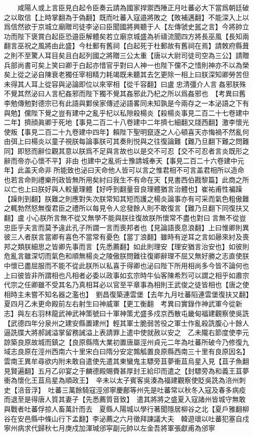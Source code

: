 　　咸陽人或上言臣見白起令臣奏云請為國家捍禦西陲正月吐蕃必大下當爲朝廷破之以取信【上時掌翻為于偽翻】既而吐蕃入寇邉將敗之【敗補邁翻】不能深入上以爲信然欲于京城立廟贈司徒李泌曰臣聞國將興聽于人【左傳虢史嚚之言】今將帥立功而陛下褒賞白起臣恐邉臣解體矣若立廟京城盛為祈禱流聞四方將長巫風【長知兩翻言巫祝之風將由此盛】今杜郵有舊祠【白起死于杜郵故有舊祠在焉】請敇府縣葺之則不至驚人耳目矣且白起列國之將贈三公太重【唐以大尉司徒司空為三公】請贈兵部尚書可矣上笑曰卿于白起亦惜官乎對曰人神一也陛下儻不之惜則神亦不以為榮矣上從之泌自陳衰老獨任宰相精力耗竭既未聽其去乞更除一相上曰朕深知卿勞苦但未得其人耳上從容與泌論即位以來宰相【從千容翻】曰盧忠清彊介人言姦邪朕殊不覺其然泌曰人言杞姦邪而陛下獨不覺其姦邪此乃杞之所以爲姦邪也　【考異曰舊李勉傳勉對德宗已有此語與鄴侯家傳述泌語畧同未知孰是今兩存之一本泌語之下有與勉】儻陛下覺之豈有建中之亂乎杞以私隙殺楊炎【殺楊炎事見二百二十七卷建中二年】擠顔眞卿于死地【事見二百二十八卷建中二年擠七細翻又牋西翻】激李懷光使叛【事見二百二十九卷建中四年】賴陛下聖明竄逐之人心頓喜天亦悔禍不然亂何由弭上曰楊炎以童子視朕每論事朕可其奏則悦與之往復論難【難乃旦翻下難之問難同】即怒而辭位觀其意以朕爲不足與言故也以是交不可忍【交不可忍者言炎既形之辭而帝亦心懷不平】非由也建中之亂術士豫請城奉天【事見二百二十六卷建中元年】此盖天命非所能致也泌曰天命他人皆可以言之惟君相不可言盖君相所以造命也若言命則禮樂刑政皆無所用矣紂曰我生不有命在天【見書西伯戡黎篇】此商之所以亡也上曰朕好與人較量理體【好呼到翻量音良理體猶言治體也】崔祐甫性褊躁【躁則到翻】朕難之則應對失次朕常知其短而護之楊炎論事亦有可采而氣色粗傲難之輒勃然怒無復君臣之禮所以每見令人忿發餘人則不敢復言【難乃旦翻下同復扶又翻】盧小心朕所言無不從又無學不能與朕往復故朕所懷常不盡也對曰言無不從豈忠臣乎夫言而莫予違此孔子所謂一言而喪邦者也【見論語喪息浪翻】上曰惟卿則異彼三人者朕言當卿有喜色不當常有憂色【當丁浪翻】雖時有逆耳之言如曏來紂及喪邦之類朕細思之皆卿先事而言【先悉薦翻】如此則理安【理安猶言治安也】如彼則危亂言雖深切而氣色和順無楊炎之陵傲朕問難往復卿辭理不屈又無好勝之志直使朕中懷已盡屈服而不能不從此朕所以私喜于得卿也泌曰陛下所用相尚多今皆不論何也上曰彼皆非所謂相也凡相者必委以政事如玄宗時牛仙客陳希烈可以謂之相乎如肅宗代宗之任卿雖不受其名乃真相耳必以官至平章事為相則王武俊之徒皆相也【唐之使相時主未嘗不知名器之濫也】　劉昌復築連雲堡【去年九月吐蕃䧟連雲堡復扶又翻】夏四月乙未更命殿前左右射生曰神威軍【更工衡翻　考異曰實錄作神武軍今從新志】與左右羽林龍武神武神策號曰十軍神策尤盛多戍京西散屯畿甸福建觀察使吳詵【武德四年分泉州之建安縣置建州】輕其軍士脆弱苦役之軍士作亂殺詵腹心十餘人逼詵牒大將郝誡溢掌留務誡溢上表請罪上遣中使就赦以安之　乙未隴右節度使李元諒築良原故城而鎮之【良原縣隋大業初置唐屬涇州貞元二年為吐蕃所破今乃修復九域志良原在涇州西南六十里宋白曰隋分安定鶉觚置良原縣西南三十里有良原因名】　雲南王異牟尋欲内附未敢自遣使先遣其東蠻鬼主驃旁苴夢衝苴烏星入見【苴子魚翻見賢遍翻】五月乙卯宴之于麟德殿賜賚甚厚封王給印而遣之【封驃旁為和義王苴夢衝為懷化王苴烏星為順政王】　辛未以太子賓客吳湊為福建觀察使貶吳詵為涪州刺史【涪音浮】　吐蕃三萬餘騎寇涇邠寧慶鄜等州先是吐蕃常以秋冬入寇及春多病疫而退至是得唐人質其妻子【先悉薦質音致】　遣其將將之盛夏入寇諸州皆城守無敢與戰者吐蕃俘掠人畜萬計而去　夏縣人陽城以學行著聞隱居柳谷之北【夏戶雅翻柳谷在安邑縣中條山行下孟翻】李泌薦之六月徵拜諫議大夫　韓遊瓌以吐蕃犯塞自戍寧州病求代歸秋七月庚戍加渾瑊邠寜副元帥以左金吾將軍張獻甫為邠寧